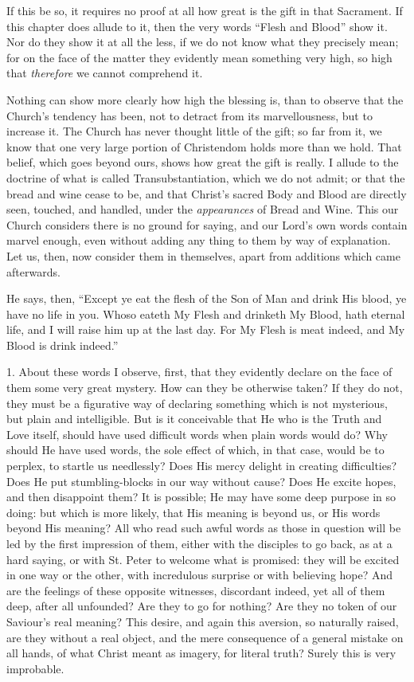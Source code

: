 If this be so, it requires no proof at all how great is the gift in
that Sacrament. If this chapter does allude to it, then the very words
``Flesh and Blood'' show it. Nor do they show it at all the
less, if we do not know what they precisely mean; for on the face of
the matter they evidently mean something very high, so high that \emph{therefore}
we cannot comprehend it.

Nothing can show more clearly how high the blessing is, than to
observe that the Church's tendency has been, not to detract from its
marvellousness, but to increase it. The Church has never thought
little of the gift; so far from it, we know that one very large
portion of Christendom holds more than we hold. That belief, which
goes beyond ours, shows how great the gift is really. I allude to the
doctrine of what is called Transubstantiation, which we do not admit;
or that the bread and wine cease to be, and that Christ's sacred Body
and Blood are directly seen, touched, and handled, under the \emph{appearances}
of Bread and Wine. This our Church considers there is no ground for
saying, and our Lord's own words contain marvel enough, even without
adding any thing to them by way of explanation. Let us, then, now
consider them in themselves, apart from additions which came
afterwards.

He says, then, ``Except ye eat the flesh of the Son of Man and
drink His blood, ye have no life in you. Whoso eateth My Flesh and
drinketh My Blood, hath eternal life, and I will raise him up at the
last day. For My Flesh is meat indeed, and My Blood is drink
indeed.''

1. About these words I observe, first, that they evidently declare
on the face of them some very great mystery. How can they be otherwise
taken? If they do not, they must be a figurative way of declaring
something which is not mysterious, but plain and intelligible. But is
it conceivable that He who is the Truth and Love itself, should have
used difficult words when plain words would do? Why should He have
used words, the sole effect of which, in that case, would be to
perplex, to startle us needlessly? Does His mercy delight in creating
difficulties? Does He put stumbling-blocks in our way without cause?
Does He excite hopes, and then disappoint them? It is possible; He may
have some deep purpose in so doing: but which is more likely, that His
meaning is beyond us, or His words beyond His meaning? All who read
such awful words as those in question will be led by the first
impression of them, either with the disciples to go back, as at a hard
saying, or with St. Peter to welcome what is promised: they will be
excited in one way or the other, with incredulous surprise or with
believing hope? And are the feelings of these opposite witnesses,
discordant indeed, yet all of them deep, after all unfounded? Are they
to go for nothing? Are they no token of our Saviour's real meaning?
This desire, and again this aversion, so naturally raised, are they
without a real object, and the mere consequence of a general mistake
on all hands, of what Christ meant as imagery, for literal truth?
Surely this is very improbable.

